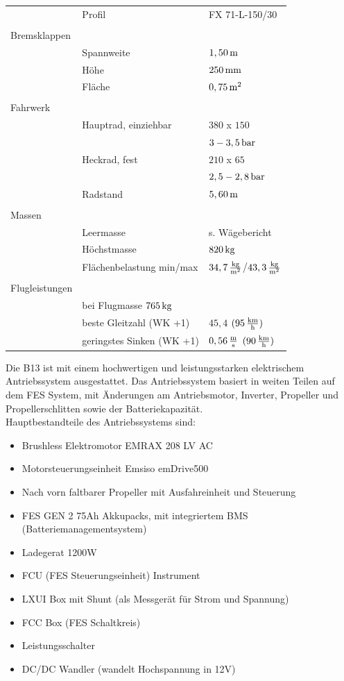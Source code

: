 \begin{longtable}{l l l}
 & Profil & FX 71-L-150/30\\
 & & \\
 Bremsklappen & & \\
 & Spannweite & $\unit[1,50]{m}$\\
 & Höhe & $\unit[250]{mm}$ \\
 & Fläche & $\unit[0,75]{m^2}$\\
 & & \\
 Fahrwerk & & \\
 & Hauptrad, einziehbar & $380$ x $150$\\ 
 & & $\unit[3-3,5]{bar}$\\
 & Heckrad, fest & $210$ x $65$ \\ 
 & & $\unit[2,5-2,8]{bar}$\\
 & Radstand & $\unit[5,60]{m}$\\
 & & \\
 Massen & & \\
 & Leermasse & s. Wägebericht\\
 & Höchstmasse & $\unit[820]{kg}$\\
 & Flächenbelastung min/max & $\unit[34,7]{\frac{kg}{m^2}}$/$\unit[43,3]{\frac{kg}{m^2}}$\\
 & & \\
 Flugleistungen & & \\
 & bei Flugmasse $\unit[765]{kg}$ & \\
 & beste Gleitzahl (WK +1) & $45,4$ $(\unit[95]{\frac{km}{h}})$ \\
 & geringstes Sinken (WK +1) & $\unit[0,56]{\frac{m}{s}}$ $ (\unit[90]{\frac{km}{h}})$

\end{longtable}
\newpage
Die B13 ist mit einem hochwertigen und leistungsstarken elektrischem Antriebssystem ausgestattet. Das Antriebssystem basiert in weiten Teilen auf dem FES System, mit Änderungen am Antriebsmotor, Inverter, Propeller und Propellerschlitten sowie der Batteriekapazität.\\

Hauptbestandteile des Antriebssystems sind:
\begin{itemize}
\item Brushless Elektromotor EMRAX 208 LV AC
\item Motorsteuerungseinheit Emsiso emDrive500
\item Nach vorn faltbarer Propeller mit Ausfahreinheit und Steuerung
\item FES GEN 2 75Ah Akkupacks, mit integriertem BMS (Batteriemanagementsystem)
\item Ladegerat 1200W
\item FCU (FES Steuerungseinheit) Instrument
\item LXUI Box mit Shunt (als Messgerät für Strom und Spannung)
\item FCC Box (FES Schaltkreis)
\item Leistungsschalter
\item DC/DC Wandler (wandelt Hochspannung in 12V)
\end{itemize}




